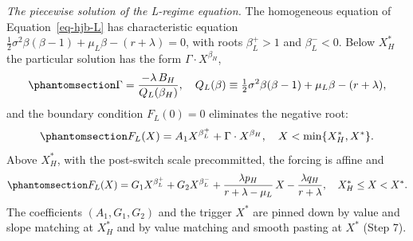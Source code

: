 \documentclass[
  11pt,
  letterpaper,
]{scrartcl}
\begin{document}
\emph{The piecewise solution of the L-regime equation.} The homogeneous
equation of Equation~\ref{eq-hjb-L} has characteristic equation
\(\tfrac{1}{2}\sigma^2 \beta(\beta - 1) + \mu_L \beta - (r + \lambda) = 0\),
with roots \(\beta_L^+ > 1\) and \(\beta_L^- < 0\). Below \(X_H^*\) the
particular solution has the form \(\Gamma \cdot X^{\beta_H}\),
\begin{equation}\protect\phantomsection\label{eq-particular-C}{
\Gamma = \frac{-\lambda\, B_H}{Q_L(\beta_H)}, \quad Q_L(\beta) \equiv \tfrac{1}{2}\sigma^2 \beta(\beta - 1) + \mu_L \beta - (r + \lambda),
}\end{equation} and the boundary condition \(F_L(0) = 0\) eliminates the
negative root:
\begin{equation}\protect\phantomsection\label{eq-option-L-general}{
F_L(X) = A_1 X^{\beta_L^+} + \Gamma \cdot X^{\beta_H}, \quad X < \min\{X_H^*, X^*\}.
}\end{equation} Above \(X_H^*\), with the post-switch scale
precommitted, the forcing is affine and
\begin{equation}\protect\phantomsection\label{eq-option-L-upper}{
F_L(X) = G_1 X^{\beta_L^+} + G_2 X^{\beta_L^-} + \frac{\lambda p_H}{r + \lambda - \mu_L}\,X - \frac{\lambda q_H}{r + \lambda}, \quad X_H^* \leq X < X^*.
}\end{equation} The coefficients \((A_1, G_1, G_2)\) and the trigger
\(X^*\) are pinned down by value and slope matching at \(X_H^*\) and by
value matching and smooth pasting at \(X^*\) (Step 7).
\end{document}
